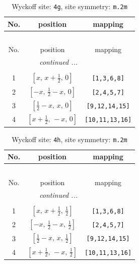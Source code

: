 \documentclass[fleqn,8pt]{jsarticle}
\begin{document}
\renewcommand{\arraystretch}{1.2}
\begin{longtable}{ccc}
\caption{Wyckoff site: {\tt 4g}, site symmetry: {\tt m.2m}}
 \\
 \hline \hline
No. & position & mapping \\ \hline \endfirsthead

\multicolumn{2}{l}{\tablename\ \thetable{}} \\
 \hline \hline
No. & position & mapping \\ \hline \endhead

 \hline \hline
\multicolumn{2}{r}{\footnotesize\it continued ...} \\ \endfoot

 \hline \hline
\multicolumn{2}{r}{} \\ \endlastfoot

1 & $\left[ x,\, x + \frac{1}{2},\, 0 \right]$ & {\tt [1,3,6,8]} \\ \hline
2 & $\left[ - x,\, \frac{1}{2} - x,\, 0 \right]$ & {\tt [2,4,5,7]} \\ \hline
3 & $\left[ \frac{1}{2} - x,\, x,\, 0 \right]$ & {\tt [9,12,14,15]} \\ \hline
4 & $\left[ x + \frac{1}{2},\, - x,\, 0 \right]$ & {\tt [10,11,13,16]} \\
\end{longtable}
\renewcommand{\arraystretch}{1.2}
\begin{longtable}{ccc}
\caption{Wyckoff site: {\tt 4h}, site symmetry: {\tt m.2m}}
 \\
 \hline \hline
No. & position & mapping \\ \hline \endfirsthead

\multicolumn{2}{l}{\tablename\ \thetable{}} \\
 \hline \hline
No. & position & mapping \\ \hline \endhead

 \hline \hline
\multicolumn{2}{r}{\footnotesize\it continued ...} \\ \endfoot

 \hline \hline
\multicolumn{2}{r}{} \\ \endlastfoot

1 & $\left[ x,\, x + \frac{1}{2},\, \frac{1}{2} \right]$ & {\tt [1,3,6,8]} \\ \hline
2 & $\left[ - x,\, \frac{1}{2} - x,\, \frac{1}{2} \right]$ & {\tt [2,4,5,7]} \\ \hline
3 & $\left[ \frac{1}{2} - x,\, x,\, \frac{1}{2} \right]$ & {\tt [9,12,14,15]} \\ \hline
4 & $\left[ x + \frac{1}{2},\, - x,\, \frac{1}{2} \right]$ & {\tt [10,11,13,16]} \\
\end{longtable}
\end{document}
